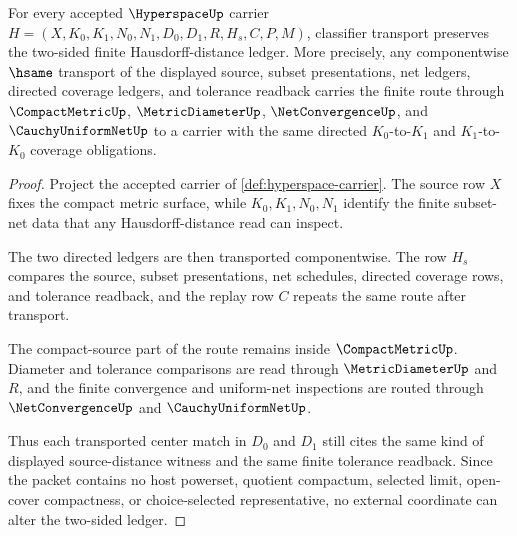 \begin{theorem}
\label{thm:hyperspace-hausdorff-distance-stability}
For every accepted $\HyperspaceUp$ carrier $H=(X,K_0,K_1,N_0,N_1,D_0,D_1,R,H_s,C,P,M)$, classifier transport preserves the two-sided finite Hausdorff-distance ledger. More precisely, any componentwise $\hsame$ transport of the displayed source, subset presentations, net ledgers, directed coverage ledgers, and tolerance readback carries the finite route through $\CompactMetricUp$, $\MetricDiameterUp$, $\NetConvergenceUp$, and $\CauchyUniformNetUp$ to a carrier with the same directed $K_0$-to-$K_1$ and $K_1$-to-$K_0$ coverage obligations.
\end{theorem}
\begin{proof}
Project the accepted carrier of \autoref{def:hyperspace-carrier}. The source row $X$ fixes the compact metric surface, while $K_0,K_1,N_0,N_1$ identify the finite subset-net data that any Hausdorff-distance read can inspect.

The two directed ledgers are then transported componentwise. The row $H_s$ compares the source, subset presentations, net schedules, directed coverage rows, and tolerance readback, and the replay row $C$ repeats the same route after transport.

The compact-source part of the route remains inside $\CompactMetricUp$. Diameter and tolerance comparisons are read through $\MetricDiameterUp$ and $R$, and the finite convergence and uniform-net inspections are routed through $\NetConvergenceUp$ and $\CauchyUniformNetUp$.

Thus each transported center match in $D_0$ and $D_1$ still cites the same kind of displayed source-distance witness and the same finite tolerance readback. Since the packet contains no host powerset, quotient compactum, selected limit, open-cover compactness, or choice-selected representative, no external coordinate can alter the two-sided ledger.
\end{proof}

